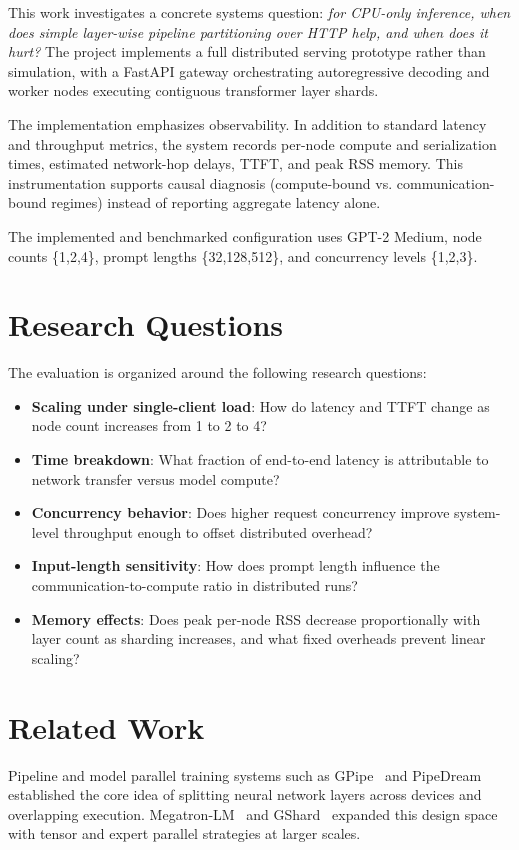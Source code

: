 \documentclass[conference]{IEEEtran}
\begin{document}
This work investigates a concrete systems question: \textit{for CPU-only inference, when does simple layer-wise pipeline partitioning over HTTP help, and when does it hurt?} The project implements a full distributed serving prototype rather than simulation, with a FastAPI gateway orchestrating autoregressive decoding and worker nodes executing contiguous transformer layer shards.

The implementation emphasizes observability. In addition to standard latency and throughput metrics, the system records per-node compute and serialization times, estimated network-hop delays, TTFT, and peak RSS memory. This instrumentation supports causal diagnosis (compute-bound vs. communication-bound regimes) instead of reporting aggregate latency alone.

The implemented and benchmarked configuration uses GPT-2 Medium, node counts \{1,2,4\}, prompt lengths \{32,128,512\}, and concurrency levels \{1,2,3\}.

\section{Research Questions}
The evaluation is organized around the following research questions:

\begin{itemize}
\item \textbf{Scaling under single-client load}: How do latency and TTFT change as node count increases from 1 to 2 to 4?
\item \textbf{Time breakdown}: What fraction of end-to-end latency is attributable to network transfer versus model compute?
\item \textbf{Concurrency behavior}: Does higher request concurrency improve system-level throughput enough to offset distributed overhead?
\item \textbf{Input-length sensitivity}: How does prompt length influence the communication-to-compute ratio in distributed runs?
\item \textbf{Memory effects}: Does peak per-node RSS decrease proportionally with layer count as sharding increases, and what fixed overheads prevent linear scaling?
\end{itemize}

\section{Related Work}
Pipeline and model parallel training systems such as GPipe~\cite{gpipe} and PipeDream~\cite{pipedream} established the core idea of splitting neural network layers across devices and overlapping execution. Megatron-LM~\cite{megatron} and GShard~\cite{gshard} expanded this design space with tensor and expert parallel strategies at larger scales.
\end{document}
